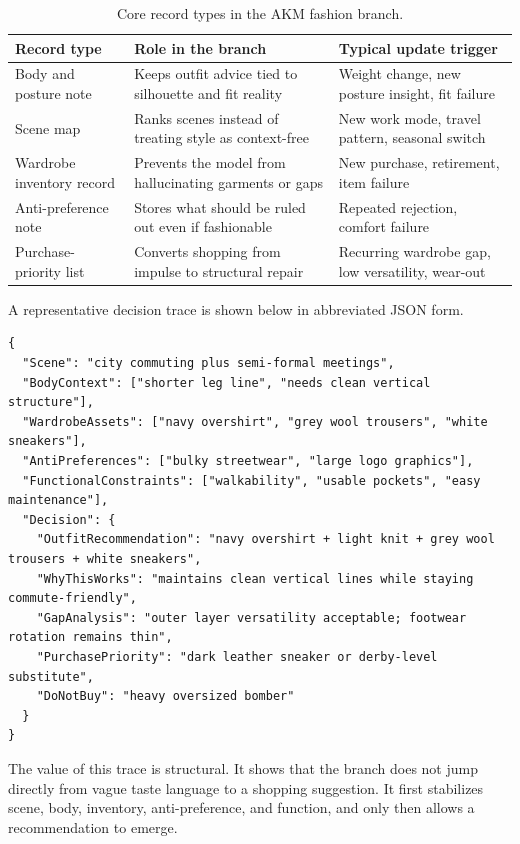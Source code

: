 \documentclass[11pt]{article}
\begin{document}
\begin{table}[htbp]
\centering
\small
\begin{tabular}{>{\raggedright\arraybackslash}p{} >{\raggedright\arraybackslash}p{} >{\raggedright\arraybackslash}p{}}
\toprule
Record type & Role in the branch & Typical update trigger \\
\midrule
Body and posture note & Keeps outfit advice tied to silhouette and fit reality & Weight change, new posture insight, fit failure \\
Scene map & Ranks scenes instead of treating style as context-free & New work mode, travel pattern, seasonal switch \\
Wardrobe inventory record & Prevents the model from hallucinating garments or gaps & New purchase, retirement, item failure \\
Anti-preference note & Stores what should be ruled out even if fashionable & Repeated rejection, comfort failure \\
Purchase-priority list & Converts shopping from impulse to structural repair & Recurring wardrobe gap, low versatility, wear-out \\
\bottomrule
\end{tabular}
\caption{Core record types in the AKM fashion branch.}
\label{tab:records}
\end{table}

A representative decision trace is shown below in abbreviated JSON form.

\begin{verbatim}
{
  "Scene": "city commuting plus semi-formal meetings",
  "BodyContext": ["shorter leg line", "needs clean vertical structure"],
  "WardrobeAssets": ["navy overshirt", "grey wool trousers", "white sneakers"],
  "AntiPreferences": ["bulky streetwear", "large logo graphics"],
  "FunctionalConstraints": ["walkability", "usable pockets", "easy maintenance"],
  "Decision": {
    "OutfitRecommendation": "navy overshirt + light knit + grey wool trousers + white sneakers",
    "WhyThisWorks": "maintains clean vertical lines while staying commute-friendly",
    "GapAnalysis": "outer layer versatility acceptable; footwear rotation remains thin",
    "PurchasePriority": "dark leather sneaker or derby-level substitute",
    "DoNotBuy": "heavy oversized bomber"
  }
}
\end{verbatim}

The value of this trace is structural. It shows that the branch does not jump directly from vague taste language to a shopping suggestion. It first stabilizes scene, body, inventory, anti-preference, and function, and only then allows a recommendation to emerge.
\end{document}
